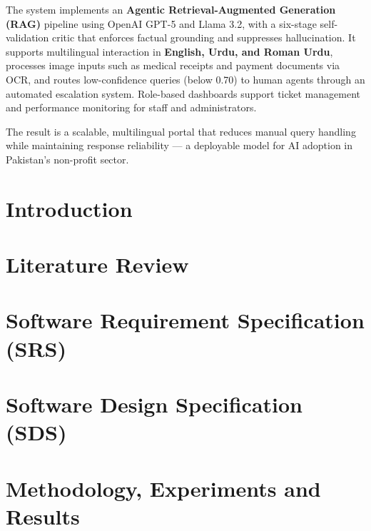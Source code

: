 \documentclass[12pt,twosided]{report}
\begin{document}
The system implements an \textbf{Agentic Retrieval-Augmented Generation (RAG)} 
pipeline using OpenAI GPT-5 and Llama 3.2, with a six-stage self-validation 
critic that enforces factual grounding and suppresses hallucination. It supports 
multilingual interaction in \textbf{English, Urdu, and Roman Urdu}, processes 
image inputs such as medical receipts and payment documents via OCR, and routes 
low-confidence queries (below 0.70) to human agents through an automated 
escalation system. Role-based dashboards support ticket management and 
performance monitoring for staff and administrators.

The result is a scalable, multilingual portal that reduces manual query handling 
while maintaining response reliability — a deployable model for AI adoption in 
Pakistan's non-profit sector.

\tableofcontents
\listoffigures
\listoftables

\chapter{Introduction}
\label{chap:intro}


\chapter{Literature Review}
\label{chap:lit}


\chapter{Software Requirement Specification (SRS)}
\label{chap:srs}


\chapter{Software Design Specification (SDS)}
\label{chap:sds}


\chapter{Methodology, Experiments and Results}
\label{chap:results}

\end{document}

